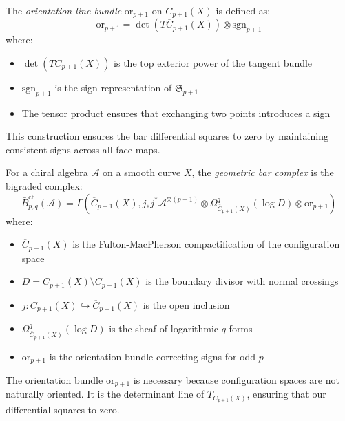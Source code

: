 \begin{definition}\label{def:orientation}
The \emph{orientation line bundle} $\text{or}_{p+1}$ on $\overline{C}_{p+1}(X)$ is defined as:
\[
\text{or}_{p+1} = \det(T\overline{C}_{p+1}(X)) \otimes \text{sgn}_{p+1}
\]
where:
\begin{itemize}
\item $\det(T\overline{C}_{p+1}(X))$ is the top exterior power of the tangent bundle
\item $\text{sgn}_{p+1}$ is the sign representation of $\mathfrak{S}_{p+1}$
\item The tensor product ensures that exchanging two points introduces a sign
\end{itemize}
This construction ensures the bar differential squares to zero by maintaining consistent signs across all face maps.
\end{definition}

\begin{definition}\label{def:geom-bar}
For a chiral algebra $\mathcal{A}$ on a smooth curve $X$, the \emph{geometric bar complex} is the bigraded complex:
\[
\bar{B}^{\text{ch}}_{p,q}(\mathcal{A}) = \Gamma\left(\overline{C}_{p+1}(X), j_*j^*\mathcal{A}^{\boxtimes(p+1)} \otimes \Omega^q_{\overline{C}_{p+1}(X)}(\log D) \otimes \text{or}_{p+1}\right)
\]
where:
\begin{itemize}
\item $\overline{C}_{p+1}(X)$ is the Fulton-MacPherson compactification of the configuration space
\item $D = \overline{C}_{p+1}(X) \setminus C_{p+1}(X)$ is the boundary divisor with normal crossings
\item $j: C_{p+1}(X) \hookrightarrow \overline{C}_{p+1}(X)$ is the open inclusion
\item $\Omega^q_{\overline{C}_{p+1}(X)}(\log D)$ is the sheaf of logarithmic $q$-forms
\item $\text{or}_{p+1}$ is the orientation bundle correcting signs for odd $p$
\end{itemize}
\end{definition}
 
\begin{remark}
The orientation bundle $\text{or}_{p+1}$ is necessary because configuration spaces are not naturally 
oriented. It is the determinant line of $T_{C_{p+1}(X)}$, ensuring that our differential squares to zero.
\end{remark}
 
